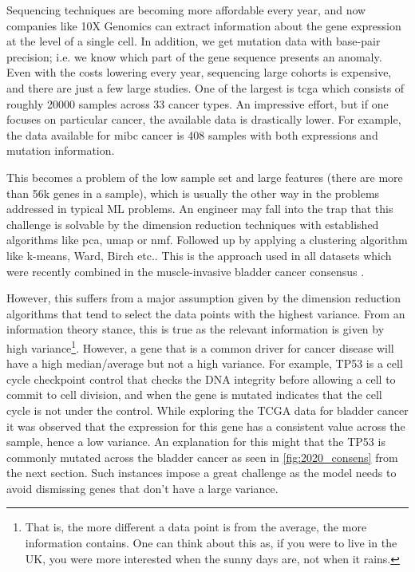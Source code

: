 
Sequencing techniques are becoming more affordable every year, and now companies like 10X Genomics can extract information about the gene expression at the level of a single cell. In addition, we get mutation data with base-pair precision; i.e. we know which part of the gene sequence presents an anomaly. Even with the costs lowering every year, sequencing large cohorts is expensive, and there are just a few large studies. One of the largest is \acrshort{tcga}\cite{Tcga2018-sj} which consists of roughly 20000 samples across 33 cancer types. An impressive effort, but if one focuses on particular cancer, the available data is drastically lower. For example, the data available for \acrfull{mibc} cancer is 408 samples with both expressions and mutation information\cite{Robertson2017-mg}.  

This becomes a problem of the low sample set and large features (there are more than 56k genes in a sample), which is usually the other way in the problems addressed in typical ML problems. An engineer may fall into the trap that this challenge is solvable by the dimension reduction techniques with established algorithms like \acrfull{pca}, \acrfull{umap} or \acrfull{nmf}. Followed up by applying a clustering algorithm like k-means, Ward, Birch etc.. This is the approach used in all datasets which were recently combined in the muscle-invasive bladder cancer consensus \citet{Kamoun2020-tj}.

However, this suffers from a major assumption given by the dimension reduction algorithms that tend to select the data points with the highest variance. From an information theory stance, this is true as the relevant information is given by high variance\footnote{That is, the more different a data point is from the average, the more information contains. One can think about this as, if you were to live in the UK, you were more interested when the sunny days are, not when it rains.}. However, a gene that is a common driver for cancer disease will have a high median/average but not a high variance. For example, TP53 is a cell cycle checkpoint control that checks the DNA integrity before allowing a cell to commit to cell division, and when the gene is mutated indicates that the cell cycle is not under the control. While exploring the TCGA data for bladder cancer \cite{Tcga2018-sj,Robertson2017-mg} it was observed that the expression for this gene has a consistent value across the sample, hence a low variance. An explanation for this might that the TP53 is commonly mutated across the bladder cancer as seen in \cref{fig:2020_consens} from the next section. Such instances impose a great challenge as the model needs to avoid dismissing genes that don't have a large variance.

